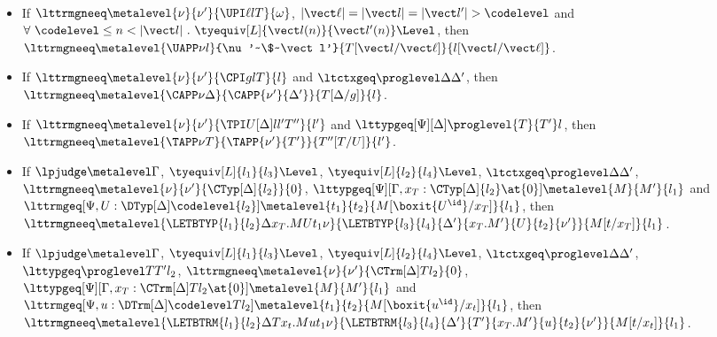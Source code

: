 \begin{law} $ $
  \begin{itemize}
  \item If $\lttrmgneeq \metalevel{\nu}{\nu'}{\UPI \ell l T}{\omega}$, $|\vect\ell| = |\vect l| = |\vect
    l'| > \codelevel$ and
    $\forall ~ \codelevel \le n < |\vect l| ~.~ \tyequiv[L]{\vect l(n)}{\vect l'(n)}\Level$,
    then $\lttrmgneeq \metalevel{\UAPP \nu l}{\nu'~\$~\vect l'}{T[\vect l/\vect \ell]}{l[\vect
      l/\vect \ell]}$. 
  \item If $\lttrmgneeq \metalevel{\nu}{\nu'}{\CPI g l T}{l}$ and $\ltctxgeq \proglevel
    \Delta{\Delta'}$, then $\lttrmgneeq \metalevel{\CAPP \nu
      \Delta}{\CAPP{\nu'}{\Delta'}}{T[\Delta/g]}{l}$.
  \item If $\lttrmgneeq \metalevel{\nu}{\nu'}{\TPI U[\Delta] l{l'}{T''}}{l'}$ and
    $\lttypgeq[\Psi][\Delta] \proglevel{T}{T'}l$, then \newline
    $\lttrmgneeq \metalevel{\TAPP \nu{T}}{\TAPP{\nu'}{T'}}{T''[T/U]}{l'}$. 
  \item If $\lpjudge \metalevel \Gamma$, $\tyequiv[L]{l_1}{l_3}\Level$, 
    $\tyequiv[L]{l_2}{l_4}\Level$, $\ltctxgeq \proglevel \Delta{\Delta'}$, \newline
    $\lttrmgneeq \metalevel{\nu}{\nu'}{\CTyp[\Delta]{l_2}}{0}$, 
    $\lttypgeq[\Psi][\Gamma,x_T : \CTyp[\Delta]{l_2} \at{0}]\metalevel{M}{M'}{l_1}$
    and \newline
    $ \lttrmgeq[\Psi, U : \DTyp[\Delta]\codelevel{l_2}]\metalevel{t_1}{t_2}{M[\boxit{U^\id}/x_T]}{l_1}$, then \newline
    $\lttrmgneeq \metalevel{\LETBTYP{l_1}{l_2}
      \Delta{x_T.M}{U}{t_1}\nu}{\LETBTYP{l_3}{l_4}{\Delta'}{x_T.M'}{U}{t_2}{\nu'}}{M[t/x_T]}{l_1}$. 
  \item If $\lpjudge \metalevel \Gamma$, $\tyequiv[L]{l_1}{l_3}\Level$, 
    $\tyequiv[L]{l_2}{l_4}\Level$, $\ltctxgeq \proglevel \Delta{\Delta'}$,
    $\lttypgeq \proglevel T{T'}{l_2}$,
    $\lttrmgneeq \metalevel{\nu}{\nu'}{\CTrm[\Delta]T{l_2}}{0}$, 
    $\lttypgeq[\Psi][\Gamma,x_T : \CTrm[\Delta]T{l_2} \at{0}]\metalevel{M}{M'}{l_1}$
    and \newline
    $ \lttrmgeq[\Psi, u : \DTrm[\Delta]\codelevel T{l_2}]\metalevel{t_1}{t_2}{M[\boxit{u^\id}/x_t]}{l_1}$, then \newline
    $\lttrmgneeq \metalevel{\LETBTRM{l_1}{l_2}
      \Delta{T}{x_t.M}{u}{t_1}\nu}{\LETBTRM{l_3}{l_4}{\Delta'}{T'}{x_T.M'}{u}{t_2}{\nu'}}{M[t/x_t]}{l_1}$. 
  \end{itemize}
\end{law}


